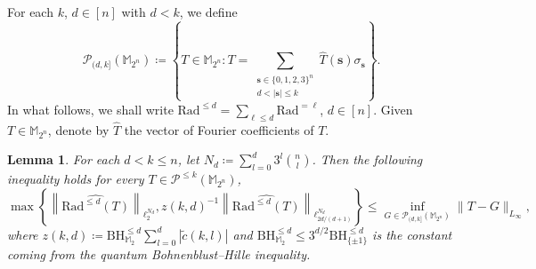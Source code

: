 \documentclass{amsbook}
\newtheorem{lemma}[theorem]{Lemma}
\theoremstyle{definition}
\theoremstyle{remark}
\numberwithin{section}{chapter}
\numberwithin{equation}{chapter}
\newcommand{\M}{\mathbb{M}}
\newcommand{\1}{\mathbf{1}}
\newcommand{\s}{\mathbf{s}}
\begin{document}
For each $k$, $d\in [n]$ with $d<k$, we define
\[
\mathcal{P}_{(d,k]}(\M_{2^n})\coloneqq\left\{T\in \M_{2^n}:T=\sum_{\substack{\s\in\{0,1,2,3\}^{n}\\d<|\s|\leq k}}\widehat{T}(\s)\sigma_{\s}\right\}.
\]
In what follows, we shall write $\mathrm{Rad}^{\leq d}=\sum_{\ell \leq d}\mathrm{Rad}^{= \ell}$, $d\in [n]$. Given $T\in \M_{2^n}$, denote by $\widehat{T}$ the vector of Fourier coefficients of $T$. 




\begin{lemma}\label{upper bound for Rademacher projection 1}
For each $d<k\leq n$, let $N_{d}\coloneqq \sum_{l=0}^{d}3^{l}\binom{n}{l}$. Then the following inequality holds for every $T\in \mathcal{P}^{\leq k}(\M_{2^n})$,
\[
\max\left\{\left\|\widehat{\mathrm{Rad}^{\leq d}(T)}\right\|_{\ell^{N_{d}}_{2}},z(k,d)^{-1}\left\|\widehat{\mathrm{Rad}^{\leq d}(T)}\right\|_{\ell^{N_{d}}_{2d/(d+1)}}\right\}\leq\inf_{G\in \mathcal{P}_{(d,k]}(\M_{2^n})}\|T-G\|_{L_{\infty}},
\]
where $z(k,d)\coloneqq \mathrm{BH}_{\mathbb{M}_2}^{\leq d} \sum_{l=0}^{d}|\tilde{c}(k,l)|$ and $\mathrm{BH}_{\mathbb{M}_2}^{\leq d} \leq 3^{d/2}\mathrm{BH}^{\leq d}_{\{\pm1\}}$ is the constant coming from the quantum Bohnenblust--Hille inequality.
\end{lemma}
\end{document}
